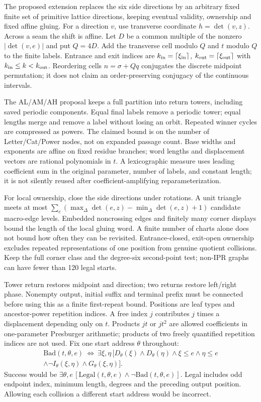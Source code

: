 \documentclass[11pt]{amsart}
\theoremstyle{definition}\newtheorem{definition}{Definition}
\begin{document}
The proposed extension replaces the six side directions by an arbitrary
fixed finite set of primitive lattice directions, keeping eventual
validity, ownership and fixed affine gluing. For a direction $v$, use
transverse coordinate $h=\det(v,z)$. Across a seam the shift is affine.
Let $D$ be a common multiple of the nonzero $|\det(v,e)|$ and put
$Q=4D$. Add the transverse cell modulo $Q$ and $t$ modulo $Q$ to the
finite labels. Entrance and exit indices are
$k_{\rm in}=\lceil\xi_{\rm in}\rceil$,
$k_{\rm out}=\lceil\xi_{\rm out}\rceil$ with
$k_{\rm in}\le k<k_{\rm out}$. Reordering cells $n=\sigma+Qq$
conjugates the discrete midpoint permutation; it does not claim an
order-preserving conjugacy of the continuous intervals.

The AL/AM/AH proposal keeps a full partition into return towers,
including saved periodic components. Equal final labels remove a
periodic tower; equal lengths merge and remove a label without losing
an orbit. Repeated winner cycles are compressed as powers. The claimed
bound is on the number of Letter/Cat/Power nodes, not on expanded
passage count. Base widths and exponents are affine on fixed residue
branches; word lengths and displacement vectors are rational
polynomials in $t$. A lexicographic measure uses leading coefficient
sum in the original parameter, number of labels, and constant length;
it is not silently reused after coefficient-amplifying reparameterization.

For local ownership, close the side directions under rotations. A
unit triangle meets at most
$\sum_e(\max_\Delta\det(e,z)-\min_\Delta\det(e,z)+1)$
candidate macro-edge levels. Embedded noncrossing edges and finitely
many corner displays bound the length of the local gluing word.
A finite number of charts alone does not bound how often they can
be revisited. Entrance-closed, exit-open ownership excludes repeated
representations of one position from genuine quotient collisions.
Keep the full corner class and the degree-six second-point test;
non-IPR graphs can have fewer than 120 legal starts.

Tower return restores midpoint and direction; two returns restore
left/right phase. Nonempty output, initial suffix and terminal prefix
must be connected before using this as a finite first-repeat bound.
Positions are leaf types and ancestor-power repetition indices.
A free index $j$ contributes $j$ times a displacement depending only
on $t$. Products $jt$ or $jt^2$ are allowed coefficients in one-parameter
Presburger arithmetic; products of two freely quantified repetition
indices are not used. Fix one start address $\theta$ throughout:
\[
\begin{split}
\mathrm{Bad}(t,\theta,e)\ \Longleftrightarrow\
\exists\xi,\eta\,[D_\theta(\xi)\wedge D_\theta(\eta)
\wedge\xi\le e\wedge\eta\le e\\
\wedge\neg I_\theta(\xi,\eta)\wedge G_\theta(\xi,\eta)].
\end{split}
\]
Success would be $\exists\theta,e\,[\mathrm{Legal}(t,\theta,e)
\wedge\neg\mathrm{Bad}(t,\theta,e)]$. Legal includes odd endpoint index,
minimum length, degrees and the preceding output position. Allowing
each collision a different start address would be incorrect.
\end{document}
